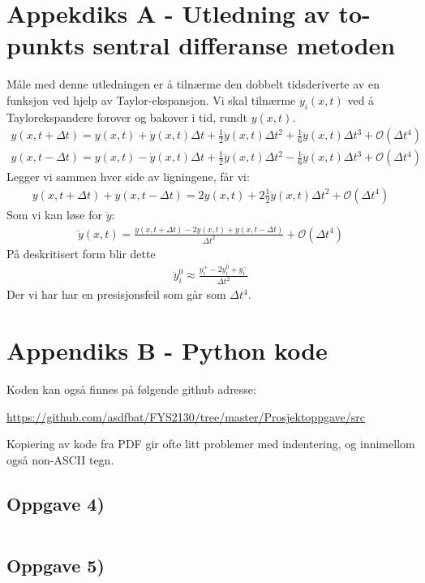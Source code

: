 \documentclass[12p,a4paper]{report}
\begin{document}
\pagebreak
\section*{Appekdiks A - Utledning av to-punkts sentral differanse metoden}
Måle med denne utledningen er å tilnærme den dobbelt tidsderiverte av en funksjon ved hjelp av Taylor-ekspansjon. Vi skal tilnærme $\ddot{y_i}(x,t)$ ved å Taylorekspandere forover og bakover i tid, rundt $y(x,t)$.
\begin{align*}
y(x,t+\Delta t) = y(x,t) + \dot{y}(x,t)\Delta t + \frac{1}{2}\ddot{y}(x,t)\Delta t^2 + \frac{1}{6}\dddot{y}(x,t) \Delta t^3 + \mathcal{O}(\Delta t^4)\\
y(x,t-\Delta t) = y(x,t) - \dot{y}(x,t)\Delta t + \frac{1}{2}\ddot{y}(x,t)\Delta t^2 - \frac{1}{6}\dddot{y}(x,t) \Delta t^3 + \mathcal{O}(\Delta t^4)
\end{align*}
Legger vi sammen hver side av ligningene, får vi:
\begin{align*}
y(x, t+\Delta t) + y(x, t-\Delta t) = 2y(x,t) + 2\frac{1}{2}\ddot{y}(x,t)\Delta t^2 + \mathcal{O}(\Delta t^4)
\end{align*}
Som vi kan løse for $\ddot{y}$:
\begin{align*}
\ddot{y}(x,t) = \frac{y(x, t+\Delta t) -2y(x,t) + y(x, t-\Delta t)}{\Delta t^2} + \mathcal{O}(\Delta t^4)
\end{align*}
På deskritisert form blir dette
\begin{align}
\ddot{y}_i^0 \approx \frac{y_i^+ - 2y_i^0 + y_i^-}{\Delta t^2}
\end{align}
Der vi har har en presisjonsfeil som går som $\Delta t^4$. 


\pagebreak
\section*{Appendiks B - Python kode}
Koden kan også finnes på følgende github adresse:

\url{https://github.com/asdfbat/FYS2130/tree/master/Prosjektoppgave/src}

Kopiering av kode fra PDF gir ofte litt problemer med indentering, og innimellom også non-ASCII tegn.

\subsection*{Oppgave 4)}
\inputminted[frame=single, fontsize=\footnotesize]{python}{../src/oppgave4.py}

\pagebreak
\subsection*{Oppgave 5)}
\inputminted[frame=single, fontsize=\footnotesize]{python}{../src/oppgave5.py}
\end{document}
